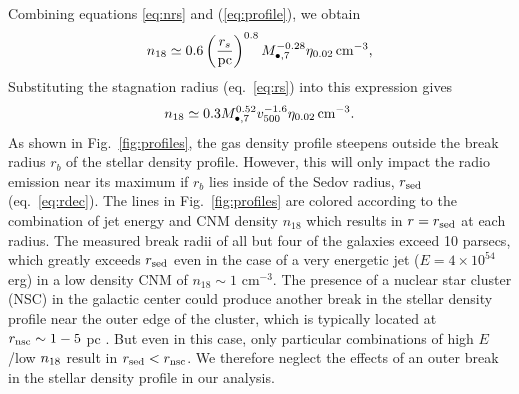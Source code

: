 \documentclass[usenatbib,fleqn]{mnras}
\newcommand{\Mbh}[1][]{M_{\bullet#1}}
\begin{document}
Combining equations \eqref{eq:nrs} and (\ref{eq:profile}), we obtain
\begin{equation}
  n_{18}\simeq 0.6 \left(\frac{r_s}{\rm pc}\right)^{0.8}
  \Mbh[,7]^{-0.28} \eta_{0.02} \, {\rm cm^{-3}},
  \label{eq:n18}
\end{equation}
%
Substituting the stagnation radius (eq.~\ref{eq:rs}) into this
expression gives
\begin{equation}
  n_{18}\simeq 0.3 \Mbh[,7]^{0.52} v_{500}^{-1.6} \eta_{0.02} \, {\rm
    cm^{-3}}.
\label{eq:n182}
\end{equation} 
%
As shown in Fig.~\ref{fig:profiles}, the gas density profile 
steepens outside the break radius $r_b$ of the stellar density
profile.  However, this will only impact the radio emission near its
maximum if $r_b$ lies inside of the Sedov radius, $r_{\rm sed}$
(eq.~\ref{eq:rdec}).  The lines in Fig.~\ref{fig:profiles} are colored
according to the combination of jet energy and CNM density $n_{18}$
which results in $r = r_{\rm sed}$ at each radius.  The measured break
radii of all but four of the \citet{Lauer+2007} galaxies exceed 10
parsecs, which greatly exceeds $r_{\rm sed}$ even in the case of a
very energetic jet ($E=4\times 10^{54}$ erg) in a low density CNM of
$n_{18} \sim 1$ cm$^{-3}$.  The presence of a nuclear star cluster
(NSC) in the galactic center could produce another break in the
stellar density profile near the outer edge of the cluster, which is
typically located at $r_{\rm nsc} \sim 1-5$ pc \citep{Georgiev+2014}.
But even in this case, only particular combinations of high $E$/low
$n_{\rm 18}$ result in $r_{\rm sed} < r_{\rm nsc}$.  We therefore
neglect the effects of an outer break in the stellar density profile
in our analysis.
\end{document}
